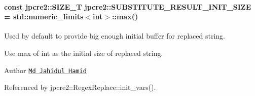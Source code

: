 \paragraph[{\texorpdfstring{S\+U\+B\+S\+T\+I\+T\+U\+T\+E\+\_\+\+R\+E\+S\+U\+L\+T\+\_\+\+I\+N\+I\+T\+\_\+\+S\+I\+ZE}{SUBSTITUTE_RESULT_INIT_SIZE}}]{\setlength{\rightskip}{0pt plus 5cm}const {\bf jpcre2\+::\+S\+I\+Z\+E\+\_\+T} jpcre2\+::\+S\+U\+B\+S\+T\+I\+T\+U\+T\+E\+\_\+\+R\+E\+S\+U\+L\+T\+\_\+\+I\+N\+I\+T\+\_\+\+S\+I\+ZE = std\+::numeric\+\_\+limits$<$int$>$\+::max()}\hypertarget{namespacejpcre2_a80cb201f2e733137b22a8ed98465096a}{}\label{namespacejpcre2_a80cb201f2e733137b22a8ed98465096a}


Used by default to provide big enough initial buffer for replaced string. 

Use max of int as the initial size of replaced string.

\begin{DoxyAuthor}{Author}
\href{https://github.com/neurobin}{\tt Md Jahidul Hamid} 
\end{DoxyAuthor}


Referenced by jpcre2\+::\+Regex\+Replace\+::init\+\_\+vars().


